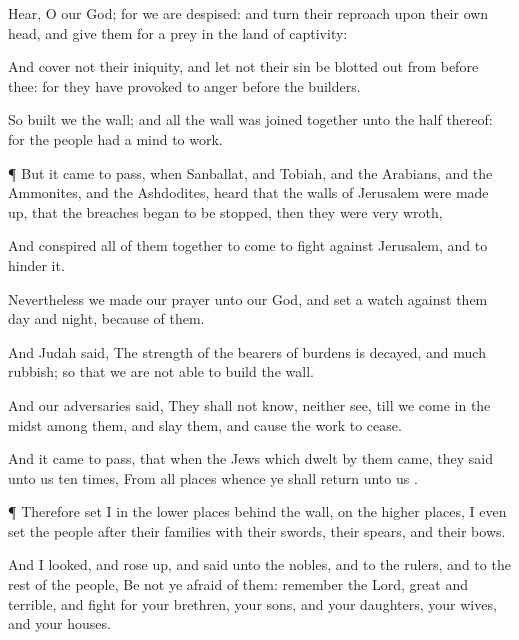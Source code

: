 {Hear, O our
God; for we are
despised: and
turn their
reproach upon their own
head, and
give them for a
prey in the
land of
captivity:

And
cover not their
iniquity, and let not their
sin be blotted
out from
before thee: for they have provoked
{} to
anger before the
builders.

So
built we the
wall; and all the
wall was joined
together unto the
half thereof: for the
people had a
mind to
work.


\par }{\PP {}¶ But it came to pass,
{} when
Sanballat, and
Tobiah, and the
Arabians, and the
Ammonites, and the
Ashdodites,
heard that the
walls of
Jerusalem were made
up,
{} that the
breaches
began to be
stopped, then they were
very
wroth,

And
conspired all of them
together to
come
{} to
fight against
Jerusalem, and to
hinder it.

Nevertheless we made our
prayer unto our
God, and
set a
watch against them
day and
night,
because of them.

And
Judah
said, The
strength of the bearers of
burdens is
decayed, and
{}
much
rubbish; so that we are not
able to
build the
wall.

And our
adversaries
said, They shall not
know, neither
see, till we
come in the
midst
among them, and
slay them, and cause the
work to
cease.

And it came to pass, that when the
Jews which
dwelt by
them
came, they
said unto us
ten
times, From all
places whence ye shall
return unto us
{}.


\par }{\PP {}¶ Therefore
set I in the
lower
places
behind the
wall,
{} on the higher
places, I even
set the
people after their
families with their
swords, their
spears, and their
bows.

And I
looked, and rose
up, and
said unto the
nobles, and to the
rulers, and to the
rest of the
people, Be not ye
afraid of
them:
remember the
Lord,
{}
great and
terrible, and
fight for your
brethren, your
sons, and your
daughters, your
wives, and your
houses.

}
